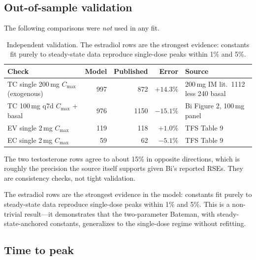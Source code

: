 \documentclass[11pt,a4paper]{article}
\newcommand{\good}[1]{#1}
\begin{document}
\subsection{Out-of-sample validation}
\label{sec:out_of_sample}

The following comparisons were \emph{not} used in any fit.

\begin{table}[h]
\centering
\footnotesize
\begin{tabular}{@{}lrrrl@{}}
\toprule
\textbf{Check} & \textbf{Model} & \textbf{Published} & \textbf{Error} & \textbf{Source} \\
\midrule
TC single 200\,mg $C_{\max}$ (exogenous) & 997 & 872 & $+14.3\%$
  & 200\,mg IM lit.\ 1112 less 240 basal \\
TC 100\,mg q7d $C_{\max}$ + basal & 976 & 1150 & $-15.1\%$
  & Bi Figure 2, 100\,mg panel \\
EV single 2\,mg $C_{\max}$ & 119 & 118 & \good{$+1.0\%$} & TFS Table 9 \\
EC single 2\,mg $C_{\max}$ & 59 & 62 & \good{$-5.1\%$} & TFS Table 9 \\
\bottomrule
\end{tabular}
\caption{Independent validation. The estradiol rows are the strongest
evidence: constants fit purely to steady-state data reproduce
single-dose peaks within 1\% and 5\%.}
\label{tab:out_of_sample}
\end{table}

The two testosterone rows agree to about 15\% in opposite directions,
which is roughly the precision the source itself supports given Bi's
reported RSEs. They are consistency checks, not tight validation.

The estradiol rows are the strongest evidence in the model: constants
fit purely to steady-state data reproduce single-dose peaks within 1\%
and 5\%. This is a non-trivial result---it demonstrates that the
two-parameter Bateman, with steady-state-anchored constants, generalizes
to the single-dose regime without refitting.

\subsection{Time to peak}
\label{sec:tmax_results}
\end{document}
